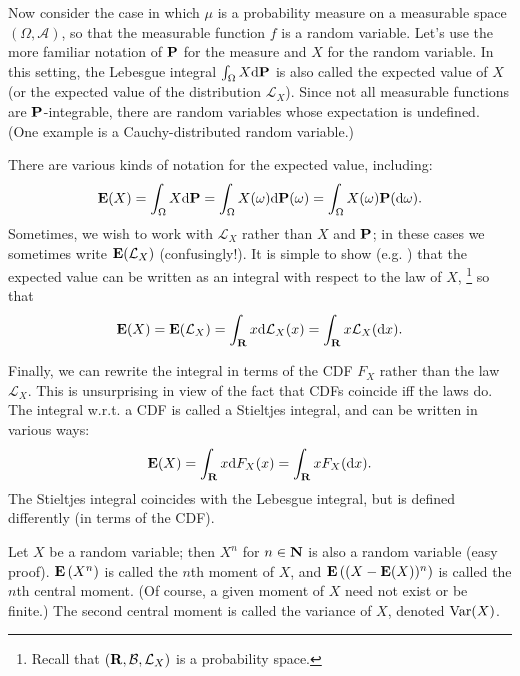 \documentclass[11pt,letterpaper,reqno,oneside]{article}
\begin{document}
Now consider the case in which $\mu$ is a probability measure on a measurable space $(\Omega,\mathcal{A})$, so that the measurable function $f$ is a random variable. Let's use the more familiar notation of $\mathbf{P}$ for the measure and $X$ for the random variable. In this setting, the Lebesgue integral $\int_\Omega X \mathrm{d} \mathbf{P}$ is also called the expected value of $X$ (or the expected value of the distribution $\mathcal{L}_X$). Since not all measurable functions are $\mathbf{P}$-integrable, there are random variables whose expectation is undefined. (One example is a Cauchy-distributed random variable.)

There are various kinds of notation for the expected value, including:
%
\begin{equation*}
	\mathbf{E}( X ) 
	= \int_\Omega X \mathrm{d}\mathbf{P}
	= \int_\Omega X(\omega) \mathrm{d}\mathbf{P}(\omega)
	= \int_\Omega X(\omega) \mathbf{P}(\mathrm{d}\omega) .
\end{equation*}
%
Sometimes, we wish to work with $\mathcal{L}_X$ rather than $X$ and $\mathbf{P}$; in these cases we sometimes write $\mathbf{E}(\mathcal{L}_X)$ (confusingly!). It is simple to show (e.g. \textcite[][Theorem 6.1.1]{Rosenthal2006}) that the expected value can be written as an integral with respect to the law of $X$,%
	\footnote{Recall that $(\mathbf{R},\mathcal{B},\mathcal{L}_X)$ is a probability space.}
so that
%
\begin{equation*}
	\mathbf{E}(X)
	= \mathbf{E}( \mathcal{L}_X )
	= \int_{\mathbf{R}} x \mathrm{d} \mathcal{L}_X(x) 
	= \int_{\mathbf{R}} x \mathcal{L}_X(\mathrm{d} x) . 
\end{equation*}


Finally, we can rewrite the integral in terms of the CDF $F_X$ rather than the law $\mathcal{L}_X$. This is unsurprising in view of the fact that CDFs coincide iff the laws do. The integral w.r.t. a CDF is called a Stieltjes integral, and can be written in various ways:
%
\begin{equation*}
	\mathbf{E}( X )
	= \int_{\mathbf{R}} x \mathrm{d} F_X(x) 
	= \int_{\mathbf{R}} x F_X(\mathrm{d} x) . 
\end{equation*}
%
The Stieltjes integral coincides with the Lebesgue integral, but is defined differently (in terms of the CDF).

Let $X$ be a random variable; then $X^n$ for $n \in \mathbf{N}$ is also a random variable (easy proof). $\mathbf{E}\left( X^n \right)$ is called the $n$th moment of $X$, and $\mathbf{E}\left( (X-\mathbf{E}(X))^n \right)$ is called the $n$th central moment. (Of course, a given moment of $X$ need not exist or be finite.) The second central moment is called the variance of $X$, denoted $\mathrm{Var}(X)$.
\end{document}
